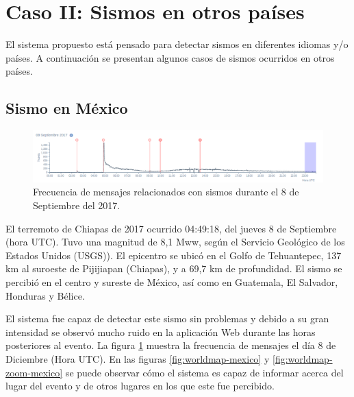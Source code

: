 	\section{Caso II: Sismos en otros países}
	
	El sistema propuesto está pensado para detectar sismos en diferentes idiomas y/o países. A continuación se presentan algunos casos de sismos ocurridos en otros países.  
	
	\subsection{Sismo en México}
	
\begin{figure}[!h]
	  \centering
	  \includegraphics[width=\textwidth]{imagenes/img-sismo-mexico.png}
	  \caption{Frecuencia de mensajes relacionados con sismos durante el 8 de Septiembre del 2017.}
		\label{fig:timeline-mexico}
\end{figure}	
		
El terremoto de Chiapas de 2017 ocurrido 04:49:18, del jueves 8 de Septiembre (hora UTC). Tuvo una magnitud de 8,1 Mww, según el Servicio Geológico de los Estados Unidos (USGS)). El epicentro se ubicó en el Golfo de Tehuantepec, 137 km al suroeste de Pijijiapan (Chiapas), y a 69,7 km de profundidad. El sismo se percibió en el centro y sureste de México, así como en Guatemala, El Salvador, Honduras y Bélice.

	El sistema fue capaz de detectar este sismo sin problemas y debido a su gran intensidad se observó mucho ruido en la aplicación Web durante las horas posteriores al evento. La figura \ref{fig:timeline-mexico} muestra la frecuencia de mensajes el día 8 de Diciembre (Hora UTC). En las figuras \ref{fig:worldmap-mexico} y \ref{fig:worldmap-zoom-mexico} se puede observar cómo el sistema es capaz de informar acerca del lugar del evento y de otros lugares en los que este fue percibido. 
	
